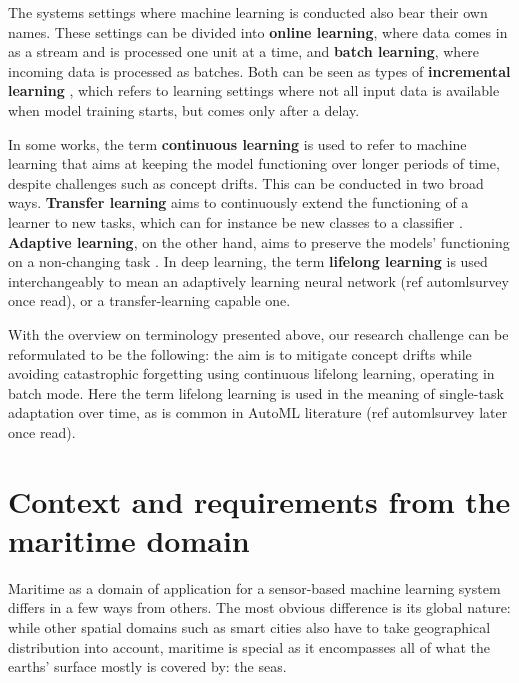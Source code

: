 The systems settings where machine learning is conducted also bear their own names. These settings can be divided into \textbf{online learning}, where data comes in as a stream and is processed one unit at a time, and \textbf{batch learning}, where incoming data is processed as batches. Both can be seen as types of \textbf{incremental learning} \cite{giraud-carrier_note_2000}, which refers to learning settings where not all input data is available when model training starts, but comes only after a delay.

In some works, the term \textbf{continuous learning} is used to refer to machine learning that aims at keeping the model functioning over longer periods of time, despite challenges such as concept drifts. This can be conducted in two broad ways. \textbf{Transfer learning} aims to continuously extend the functioning of a learner to new tasks, which can for instance be new classes to a classifier \cite{iotsurvey}. \textbf{Adaptive learning}, on the other hand, aims to preserve the models' functioning on a non-changing task \cite{conceptdriftsurvey}. In deep learning, the term \textbf{lifelong learning} is used interchangeably to mean an adaptively learning neural network (ref automlsurvey once read), or a transfer-learning capable one.

With the overview on terminology presented above, our research challenge can be reformulated to be the following: the aim is to mitigate concept drifts while avoiding catastrophic forgetting using continuous lifelong learning, operating in batch mode. Here the term lifelong learning is used in the meaning of single-task adaptation over time, as is common in AutoML literature (ref automlsurvey later once read).


\section{Context and requirements from the maritime domain}

Maritime as a domain of application for a sensor-based machine learning system differs in a few ways from others. The most obvious difference is its global nature: while other spatial domains such as smart cities also have to take geographical distribution into account, maritime is special as it encompasses all of what the earths' surface mostly is covered by: the seas. 

